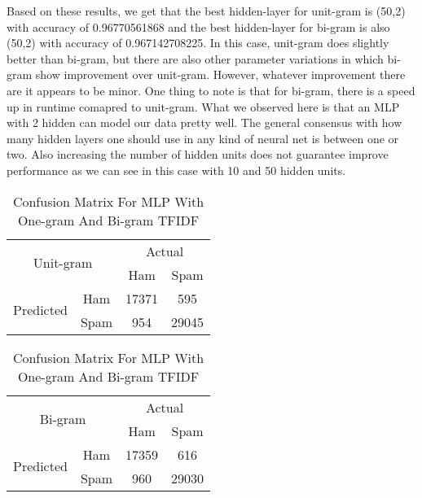 Based on these results, we get that the best hidden-layer for unit-gram is (50,2) with accuracy of 0.96770561868 and the best hidden-layer for bi-gram is also (50,2) with accuracy of 0.967142708225. In this case, unit-gram does slightly better than bi-gram, but there are also other parameter variations in which bi-gram show improvement over unit-gram. However, whatever improvement there are it appears to be minor. One thing to note is that for bi-gram, there is a speed up in runtime comapred to  unit-gram. What we observed here is that an MLP with 2 hidden can model our data pretty well. The general consensus with how many hidden layers one should use in any kind of neural net is between one or two. Also increasing the number of hidden units does not guarantee improve performance as we can see in this case with 10 and 50 hidden units. 

\begin{table}[H]
\centering
\begin{subtable}{.5\textwidth}
\centering
\begin{tabular}{@{}|c|c|c|c|@{}}
\toprule
\multicolumn{2}{|c|}{\multirow{2}{*}{Unit-gram}} & \multicolumn{2}{c|}{Actual} \\ \cmidrule(l){3-4} 
\multicolumn{2}{|c|}{}                        & Ham          & Spam         \\ \midrule
\multirow{2}{*}{Predicted}       & Ham        & 17371        & 595 \\ \cmidrule(l){2-4} 
                                 & Spam       & 954         & 29045        \\ \bottomrule
\end{tabular}

\begin{tabular}{@{}|c|c|c|c|@{}}
\toprule
\multicolumn{2}{|c|}{\multirow{2}{*}{Bi-gram}} & \multicolumn{2}{c|}{Actual} \\ \cmidrule(l){3-4} 
\multicolumn{2}{|c|}{}                        & Ham          & Spam         \\ \midrule
\multirow{2}{*}{Predicted}       & Ham        & 17359   	  & 616 \\ \cmidrule(l){2-4} 
                                 & Spam       & 960 		  & 29030 \\ \bottomrule
\end{tabular}
\end{subtable}
\caption{Confusion Matrix For MLP With One-gram And Bi-gram TFIDF}
\label{Confusion_MLP}
\end{table}



